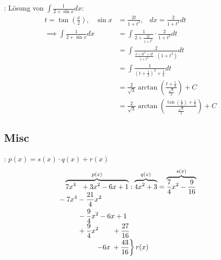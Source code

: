 \Bsp {}: Lösung von $\displaystyle \int \frac{1}{2 + \sin x} dx$:
\begin{align*}
    t = \tan(\frac{x}{2}), \hspace{10pt} \sin x &= \frac{2t}{1 + t^2}, \hspace{10pt} dx = \frac{2}{1 + t^2} dt \\[-0.1em]
    \implies \int \frac{1}{2 + \sin x} dx &= \int \frac{1}{2 + \frac{2t}{1 + t^2}} \cdot \frac{2}{1 + t^2} dt \\[-0.1em]
        &= \int \frac{2}{\frac{2 + 2t^2 + 2t}{1+t^2} \cdot (1+t^2)} dt \\[-0.1em]
        &= \int \frac{1}{(t + \frac{1}{2})^2 + \frac{3}{4}} dt \\[-0.4em]
        &= \frac{2}{\sqrt{3}} \arctan(\frac{t + \frac{1}{2}}{\frac{\sqrt{3}}{2}}) + C \\[-0.4em]
        &= \frac{2}{\sqrt{3}} \arctan(\frac{\tan(\frac{x}{2}) + \frac{1}{2}}{\frac{\sqrt{3}}{2}}) + C
\end{align*}

\subsection{Misc}

\Bsp {}: $p(x) = s(x) \cdot q(x) + r(x)$
\begin{align*}
    &\overbrace{7x^4 \hspace{7pt} + 3x^2 - 6x + 1}^{p(x)} : \overbrace{4x^2 + 3}^{q(x)} = \overbrace{\frac{7}{4}x^2 - \frac{9}{16}}^{s(x)} \\[-0.6em]
    &\hspace{-9pt}-7x^4 - \frac{21}{4}x^2 \\
    &\hspace{19pt} -\frac{9}{4}x^2 - 6x + 1 \\[-0.3em]
    &\hspace{19pt} +\frac{9}{4}x^2 \hspace{19.5pt} + \frac{27}{16} \\[-0.2em]
    &\hspace{44pt} \left. -6x \hspace{2.5pt} + \frac{43}{16} \right\} r(x)
\end{align*}
